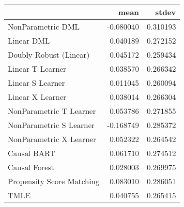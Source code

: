 \begin{tabular}{lrr}
\toprule
{} &      mean &     stdev \\
\midrule
NonParametric DML         & -0.080040 &  0.310193 \\
Linear DML                &  0.040189 &  0.272152 \\
Doubly Robust (Linear)    &  0.045172 &  0.259434 \\
Linear T Learner          &  0.038570 &  0.266342 \\
Linear S Learner          &  0.011045 &  0.260094 \\
Linear X Learner          &  0.038014 &  0.266304 \\
NonParametric T Learner   &  0.053786 &  0.271855 \\
NonParametric S Learner   & -0.168749 &  0.285372 \\
NonParametric X Learner   &  0.052322 &  0.264542 \\
Causal BART               &  0.061710 &  0.274512 \\
Causal Forest             &  0.028003 &  0.269975 \\
Propensity Score Matching &  0.083010 &  0.286051 \\
TMLE                      &  0.040755 &  0.265415 \\
\bottomrule
\end{tabular}
